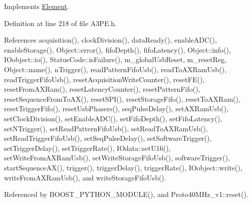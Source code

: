 Implements \hyperlink{classElement_a69efffa22f06909d768149715565cb56}{Element}.



Definition at line 218 of file A3\+P\+E.\+h.



References acquisition(), clock\+Division(), data\+Ready(), enable\+A\+D\+C(), enable\+Storage(), Object\+::error(), fifo\+Depth(), fifo\+Latency(), Object\+::info(), I\+Oobject\+::io(), Status\+Code\+::is\+Failure(), m\+\_\+global\+Usb\+Reset, m\+\_\+reset\+Reg, Object\+::name(), n\+Trigger(), read\+Pattern\+Fifo\+Usb(), read\+To\+A\+X\+Ram\+Usb(), read\+Trigger\+Fifo\+Usb(), reset\+Acquisition\+Write\+Counter(), reset\+F\+E(), reset\+From\+A\+X\+Ram(), reset\+Latency\+Counter(), reset\+Pattern\+Fifo(), reset\+Sequence\+From\+To\+A\+X(), reset\+S\+P\+I(), reset\+Storage\+Fifo(), reset\+To\+A\+X\+Ram(), reset\+Trigger\+Fifo(), reset\+Usb\+Phasers(), seq\+Pulse\+Delay(), set\+A\+X\+Ram\+Usb(), set\+Clock\+Division(), set\+Enable\+A\+D\+C(), set\+Fifo\+Depth(), set\+Fifo\+Latency(), set\+N\+Trigger(), set\+Read\+Pattern\+Fifo\+Usb(), set\+Read\+To\+A\+X\+Ram\+Usb(), set\+Read\+Trigger\+Fifo\+Usb(), set\+Seq\+Pulse\+Delay(), set\+Software\+Trigger(), set\+Trigger\+Delay(), set\+Trigger\+Rate(), I\+Odata\+::set\+U16(), set\+Write\+From\+A\+X\+Ram\+Usb(), set\+Write\+Storage\+Fifo\+Usb(), software\+Trigger(), start\+Sequence\+A\+X(), trigger(), trigger\+Delay(), trigger\+Rate(), I\+Oobject\+::write(), write\+From\+A\+X\+Ram\+Usb(), and write\+Storage\+Fifo\+Usb().



Referenced by B\+O\+O\+S\+T\+\_\+\+P\+Y\+T\+H\+O\+N\+\_\+\+M\+O\+D\+U\+L\+E(), and Proto40\+M\+Hz\+\_\+v1\+::reset().


